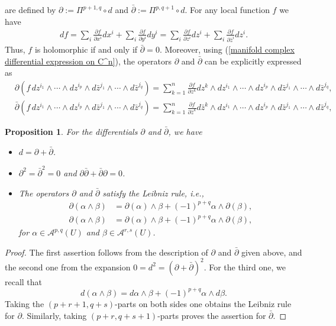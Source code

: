 \documentclass[11pt]{book}
\newtheorem{proposition}[theorem]{Proposition}
\theoremstyle{definition}
\begin{document}
are defined by $\partial:=\Pi^{p+1,q}\circ d$ and $\bar{\partial}:=\Pi^{p,q+1}\circ d$. For any local function $f$ we have
\begin{align}\label{manifold complex differential expression on C^n}
df=\sum_i\frac{\partial f}{\partial x^i}dx^i+\sum_i\frac{\partial f}{\partial y^i}dy^i=\sum_i\frac{\partial f}{\partial z^i}dz^i+\sum_i\frac{\partial f}{\partial\bar{z}^i}dz^i.
\end{align}
Thus, $f$ is holomorphic if and only if $\bar{\partial}=0$. Moreover, using (\ref{manifold complex differential expression on C^n}), the operators $\partial$ and $\bar{\partial}$ can be explicitly expressed as
\begin{align*}
&\partial(f\,dz^{i_1}\wedge\cdots\wedge dz^{i_p}\wedge d\bar{z}^{j_1}\wedge\cdots\wedge d\bar{z}^{j_q})=\sum_{k=1}^{n}\frac{\partial f}{\partial z^k}dz^k\wedge dz^{i_1}\wedge\cdots\wedge dz^{i_p}\wedge d\bar{z}^{j_1}\wedge\cdots\wedge d\bar{z}^{j_q},\\
&\bar{\partial}(f\,dz^{i_1}\wedge\cdots\wedge dz^{i_p}\wedge d\bar{z}^{j_1}\wedge\cdots\wedge d\bar{z}^{j_q})=\sum_{k=1}^{n}\frac{\partial f}{\partial \bar{z}^k}d\bar{z}^k\wedge dz^{i_1}\wedge\cdots\wedge dz^{i_p}\wedge d\bar{z}^{j_1}\wedge\cdots\wedge d\bar{z}^{j_q},
\end{align*}
\begin{proposition}\label{complex manifold partial bar-partial on C^n prop}
For the differentials $\partial$ and $\bar{\partial}$, we have
\begin{itemize}
\item[(a)] $d=\partial+\bar{\partial}$.
\item[(b)] $\partial^2=\bar{\partial}^2=0$ and $\partial\bar{\partial}+\bar{\partial}\partial=0$.
\item[(c)] The operators $\partial$ and $\bar{\partial}$ satisfy the Leibniz rule, i.e.,
\begin{align*}
\partial(\alpha\wedge\beta)&=\partial(\alpha)\wedge\beta+(-1)^{p+q}\alpha\wedge\partial(\beta),\\
\partial(\alpha\wedge\beta)&=\partial(\alpha)\wedge\beta+(-1)^{p+q}\alpha\wedge\partial(\beta),
\end{align*} 
for $\alpha\in\mathcal{A}^{p,q}(U)$ and $\beta\in\mathcal{A}^{r,s}(U)$.
\end{itemize}
\end{proposition}
\begin{proof}
The first assertion follows from the description of $\partial$ and $\bar{\partial}$ given above, and the second one from the expansion $0=d^2=(\partial+\bar{\partial})^2$. For the third one, we recall that
\[d(\alpha\wedge\beta)=d\alpha\wedge\beta+(-1)^{p+q}\alpha\wedge d\beta.\]
Taking the $(p+r+1,q+s)$-parts on both sides one obtains the Leibniz rule for $\partial$. Similarly, taking $(p+r,q+s+1)$-parts proves the assertion for $\bar{\partial}$.
\end{proof}
\end{document}
